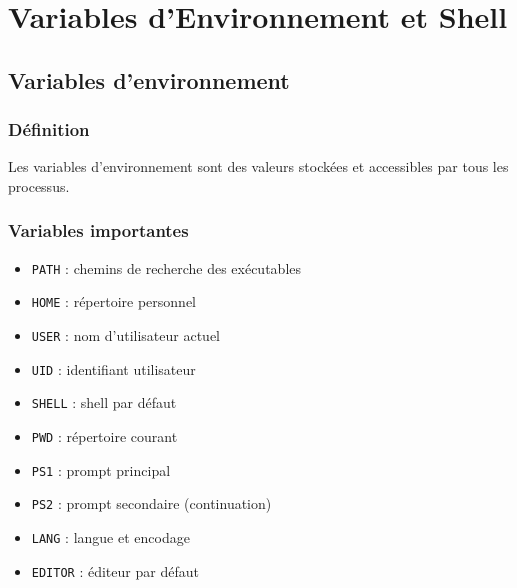 \documentclass[12pt,a4paper]{article}
\begin{document}

\section{Variables d'Environnement et Shell}


\subsection{Variables d'environnement}

\subsubsection{D\'efinition}
Les variables d'environnement sont des valeurs stock\'ees et accessibles par tous les processus.

\subsubsection{Variables importantes}
\begin{itemize}
    \item \texttt{PATH} : chemins de recherche des ex\'ecutables %
    \item \texttt{HOME} : r\'epertoire personnel %
    \item \texttt{USER} : nom d'utilisateur actuel %
    \item \texttt{UID} : identifiant utilisateur %
    \item \texttt{SHELL} : shell par d\'efaut %
    \item \texttt{PWD} : r\'epertoire courant %
    \item \texttt{PS1} : prompt principal %
    \item \texttt{PS2} : prompt secondaire (continuation) %
    \item \texttt{LANG} : langue et encodage %
    \item \texttt{EDITOR} : \'editeur par d\'efaut %
\end{itemize}
\end{document}
